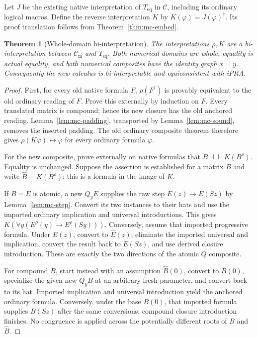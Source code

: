 \documentclass[11pt,letterpaper]{article}
\newtheorem{theorem}{Theorem}[section]
\theoremstyle{definition}
\theoremstyle{remark}
\begin{document}
Let $J$ be the existing native interpretation of $T_{\mathrm{eq}}$
in $\mathcal C$, including its ordinary logical macros.  Define the
reverse interpretation $K$ by $K(\varphi)=J(\varphi)^\dagger$.
Its proof translation follows from Theorem~\ref{thm:mc-embed}.

\begin{theorem}[Whole-domain bi-interpretation]
\label{thm:mc-bi}
The interpretations $\rho,K$ are a bi-interpretation between
$\mathcal C_{\mathrm m}$ and $T_{\mathrm{eq}}$.  Both numerical
domains are whole, equality is actual equality, and both numerical
composites have the identity graph $x=y$.  Consequently the new
calculus is bi-interpretable and equiconsistent with iPRA.
\end{theorem}
\begin{proof}
First, for every old native formula $F$,
$\rho(F^\dagger)$ is provably equivalent to the old ordinary reading
of $F$.  Prove this externally by induction on $F$.
Every translated matrix is compound; hence its new closure has the
old anchored reading.  Lemma~\ref{lem:mc-padding}, transported by
Lemma~\ref{lem:mc-sound}, removes the inserted padding.  The old
ordinary composite theorem therefore gives
$\rho(K\varphi)\leftrightarrow\varphi$ for every ordinary formula
$\varphi$.

For the new composite, prove externally on native formulas that
$B\dashv\vdash K(B^\rho)$.  Equality is unchanged.  Suppose the
assertion is established for a matrix $B$ and write
$\widehat B=K(B^\rho)$; this is a formula in the image of $K$.

If $B=E$ is atomic, a new $Q_yE$ supplies the raw step
$E(z)\to E(Sz)$ by Lemma~\ref{lem:mc-step}.  Convert its two
instances to their hats and use the imported ordinary implication
and universal introductions.  This gives
$K(\forall y(E^\rho(y)\to E^\rho(Sy)))$.
Conversely, assume that imported progressive formula.  Under $E(z)$,
convert to $\widehat E(z)$, eliminate the imported universal and
implication, convert the result back to $E(Sz)$, and use derived
closure introduction.  These are exactly the two directions of the
atomic $Q$ composite.

For compound $B$, start instead with an assumption
$\widehat B(0)$, convert to $B(0)$, specialize the given new $Q_yB$
at an arbitrary fresh parameter, and convert back to its hat.
Imported implication and universal introduction yield the anchored
ordinary formula.  Conversely, under the base $B(0)$, that imported
formula supplies $B(Sz)$ after the same conversions; compound
closure introduction finishes.  No congruence is applied across
the potentially different roots of $B$ and $\widehat B$.


\end{proof}
\end{document}
